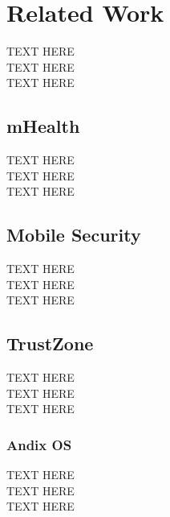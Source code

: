 
% 
% 
\section{Related Work}

TEXT HERE\\
TEXT HERE\\
TEXT HERE

\subsection{mHealth}

TEXT HERE\\
TEXT HERE\\
TEXT HERE

\subsection{Mobile Security}

TEXT HERE\\
TEXT HERE\\
TEXT HERE

\subsection{TrustZone}

TEXT HERE\\
TEXT HERE\\
TEXT HERE

\subsubsection*{Andix OS\\}
TEXT HERE\\
TEXT HERE\\
TEXT HERE

